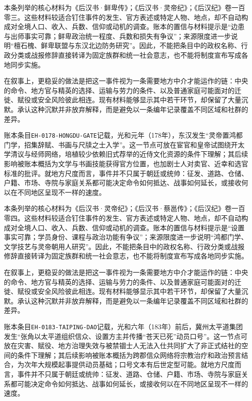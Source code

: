 本条列举的核心材料为《后汉书·鲜卑传》；《后汉书·灵帝纪》；《后汉纪》卷一百零三。这些材料较适合钉住事件的发生、官方表述或特定人物、地点，却不自动构成对全境人口、收入、兵数、信仰或动机的调查。账本的置信与材料提示是“边患与出师事实可靠；鲜卑政治统一程度、兵数和损失有争议”；来源限度进一步说明“檀石槐、鲜卑联盟与东汉北边防务研究”。因此，不能把条目中的政权名称、行政分类或战报修辞直接转译为固定族群和统一社会意志，也不能将制度宣布写成各地同步实施。

在叙事上，更稳妥的做法是把这一事件视为一条需要地方中介才能运作的链：中央的命令、地方官与精英的选择、运输与劳力的条件、以及普通家庭可能面对的迁徙、赋役或安全风险彼此相连。现有材料能够显示其中若干环节，却保留了大量沉默。承认这种沉默并非放弃解释，而是避免以一条编年记录覆盖不同区域和社群的差异。

账本条目\texttt{EH-0178-HONGDU-GATE}记载，光和元年（178年），东汉发生“灵帝置鸿都门学，招集辞赋、书画与尺牍之士入学”。这一节点可放在宦官和皇帝试图绕开太学清议与经师网络，培植较少依赖旧式荐举的近侍文化资源的条件下理解；其后续影响被账本概括为文学与书画技能获得官方位置，也加剧士人对卖官、近幸和选官标准的批评。就地方尺度而言，事件并不只属于朝廷或统帅：征发、道路、仓储、户籍、市场、寺院与家庭关系都可能决定命令如何抵达、战事如何延长，或接收何以在不同地区呈现不一样的速度。

本条列举的核心材料为《后汉书·灵帝纪》；《后汉书·蔡邕传》；《后汉纪》卷一百零四。这些材料较适合钉住事件的发生、官方表述或特定人物、地点，却不自动构成对全境人口、收入、兵数、信仰或动机的调查。账本的置信与材料提示是“设置事实可靠；学员身份、课程与政治功能有争议”；来源限度进一步说明“鸿都门学、文学技艺与灵帝朝用人研究”。因此，不能把条目中的政权名称、行政分类或战报修辞直接转译为固定族群和统一社会意志，也不能将制度宣布写成各地同步实施。

在叙事上，更稳妥的做法是把这一事件视为一条需要地方中介才能运作的链：中央的命令、地方官与精英的选择、运输与劳力的条件、以及普通家庭可能面对的迁徙、赋役或安全风险彼此相连。现有材料能够显示其中若干环节，却保留了大量沉默。承认这种沉默并非放弃解释，而是避免以一条编年记录覆盖不同区域和社群的差异。

账本条目\texttt{EH-0183-TAIPING-DAO}记载，光和六年（183年）前后，冀州太平道集团发生“张角以太平道组织信众、设置方主并传播“苍天已死”动员口号”。这一节点可放在灾害、赋役、地方治理失效与被禁锢士人无法入仕共同扩大了非正式结社的空间的条件下理解；其后续影响被账本概括为跨郡信众网络将宗教治疗和政治预言结合，为次年大规模起事提供动员基础；口号文本有后世定型可能。就地方尺度而言，事件并不只属于朝廷或统帅：征发、道路、仓储、户籍、市场、寺院与家庭关系都可能决定命令如何抵达、战事如何延长，或接收何以在不同地区呈现不一样的速度。

